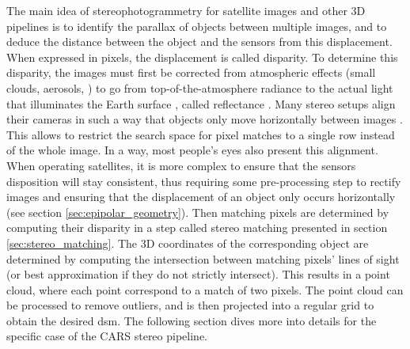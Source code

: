 The main idea of stereophotogrammetry for satellite images and other 3D pipelines is to identify the parallax of objects between multiple images, and to deduce the distance between the object and the sensors from this displacement. When expressed in pixels, the displacement is called disparity. To determine this disparity, the images must first be corrected from atmospheric effects (small clouds, aerosols, \etc) to go from top-of-the-atmosphere radiance to the actual light that illuminates the Earth surface \cite{hagolle_maja_2017}, called reflectance . Many stereo setups align their cameras in such a way that objects only move horizontally between images \cite{geiger_are_2012, scharstein_high-resolution_2014, keselman_intel_2017}. This allows to restrict the search space for pixel matches to a single row instead of the whole image. In a way, most people's eyes also present this alignment. When operating satellites, it is more complex to ensure that the sensors disposition will stay consistent, thus requiring some pre-processing step to rectify images and ensuring that the displacement of an object only occurs horizontally (see section \ref{sec:epipolar_geometry}). Then matching pixels are determined by computing their disparity in a step called stereo matching presented in section \ref{sec:stereo_matching}. The 3D coordinates of the corresponding object are determined by computing the intersection between matching pixels' lines of sight (or best approximation if they do not strictly intersect). This results in a point cloud, where each point correspond to a match of two pixels. The point cloud can be processed to remove outliers, and is then projected into a regular grid to obtain the desired \acrshort{dsm}. The following section dives more into details for the specific case of the CARS stereo pipeline.

